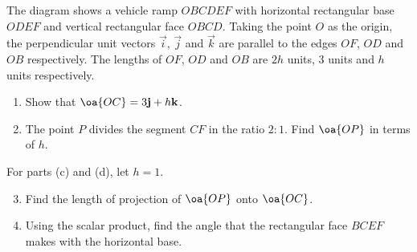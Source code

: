 \documentclass{echw}
\begin{document}

    \problem{}
        \begin{center}
        \end{center}

         The diagram shows a vehicle ramp $OBCDEF$ with horizontal rectangular base $ODEF$ and vertical rectangular face $OBCD$. Taking the point $O$ as the origin, the perpendicular unit vectors $\vec i$, $\vec j$ and $\vec k$ are parallel to the edges $OF$, $OD$ and $OB$ respectively. The lengths of $OF$, $OD$ and $OB$ are $2h$ units, 3 units and $h$ units respectively.

        \begin{enumerate}
            \item Show that $\oa{OC} = 3 \vec j + h \vec k$.
            \item The point $P$ divides the segment $CF$ in the ratio $2:1$. Find $\oa{OP}$ in terms of $h$.
        \end{enumerate}

         For parts (c) and (d), let $h = 1$.

        \begin{enumerate}
            \setcounter{enumi}{2}
            \item Find the length of projection of $\oa{OP}$ onto $\oa{OC}$.
            \item Using the scalar product, find the angle that the rectangular face $BCEF$ makes with the horizontal base.
        \end{enumerate}
\end{document}
